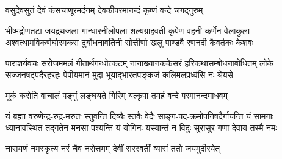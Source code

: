 \twolineshloka
{वसुदेवसुतं देवं कंसचाणूरमर्दनम्}
{देवकीपरमानन्दं कृष्णं वन्दे जगद्गुरुम्}%

\fourlineindentedshloka
{भीष्मद्रोणतटा जयद्रथजला गान्धारनीलोपला}
{शल्यग्राहवती कृपेण वहनी कर्णेन वेलाकुला}
{अश्वत्थामविकर्णघोरमकरा दुर्योधनावर्तिनी}
{सोत्तीर्णा खलु पाण्डवै रणनदी कैवर्तकः केशवः}%

\fourlineindentedshloka
{पाराशर्यवचः सरोजममलं गीतार्थगन्धोत्कटम्}
{नानाख्यानककेसरं हरिकथासम्बोधनाबोधितम्}
{लोके सज्जनषट्पदैरहरहः पेपीयमानं मुदा}
{भूयाद्भारतपङ्कजं कलिमलप्रध्वंसि नः श्रेयसे}%

\twolineshloka
{मूकं करोति वाचालं पङ्गुं लङ्घयते गिरिम्}
{यत्कृपा तमहं वन्दे परमानन्दमाधवम्}%

\fourlineindentedshloka
{यं ब्रह्मा वरुणेन्द्र-रुद्र-मरुतः स्तुवन्ति दिव्यैः स्तवैः}
{वेदैः साङ्ग-पद-क्रमोपनिषदैर्गायन्ति यं सामगाः}
{ध्यानावस्थित-तद्गतेन मनसा पश्यन्ति यं योगिनः}
{यस्यान्तं न विदुः सुरासुर-गणा देवाय तस्मै नमः}%

\twolineshloka
{नारायणं नमस्कृत्य नरं चैव नरोत्तमम्}
{देवीं सरस्वतीं व्यासं ततो जयमुदीरयेत्}%

\resetShloka